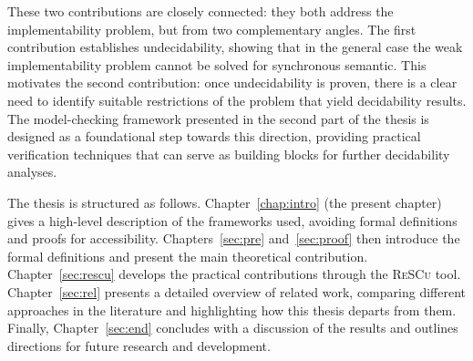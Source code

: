 These two contributions are closely connected: they both address the 
implementability problem, but from two complementary angles. The first 
contribution establishes undecidability, showing that in the general 
case the weak implementability problem cannot be solved for synchronous semantic. 
This motivates the second contribution: once undecidability is proven, 
there is a clear need to identify suitable restrictions of the problem 
that yield decidability results. The model-checking framework presented 
in the second part of the thesis is designed as a foundational step 
towards this direction, providing practical verification techniques that 
can serve as building blocks for further decidability analyses.  

The thesis is structured as follows. 
Chapter~\ref{chap:intro} (the present chapter) gives a high-level 
description of the frameworks used, avoiding formal definitions and 
proofs for accessibility. Chapters~\ref{sec:pre} and~\ref{sec:proof} 
then introduce the formal definitions and present the main theoretical 
contribution. Chapter~\ref{sec:rescu} develops the practical 
contributions through the \textsc{ReSCu} tool. 
Chapter~\ref{sec:rel} presents 
a detailed overview of related work, comparing different approaches in 
the literature and highlighting how this thesis departs from them. Finally, 
Chapter~\ref{sec:end} concludes with a discussion of the results and 
outlines directions for future research and development.
